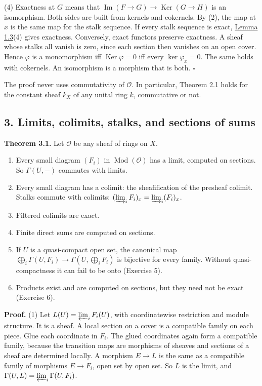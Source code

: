\documentclass[
  english,
  11pt,
  a4paper,
]{article}
\providecommand{\tightlist}{%
  \setlength{\itemsep}{0pt}\setlength{\parskip}{0pt}}
\begin{document}
(4) Exactness at \(G\) means that
\(\operatorname{Im}(F\to G)\to\operatorname{Ker}(G\to H)\) is an
isomorphism. Both sides are built from kernels and cokernels. By (2),
the map at \(x\) is the same map for the stalk sequence. If every stalk
sequence is exact,
\hyperref[sheaves-of-modules-on-a-ringed-space--sheafification-and-the-stalk-test]{Lemma
1.3}(4) gives exactness. Conversely, exact functors preserve exactness.
A sheaf whose stalks all vanish is zero, since each section then
vanishes on an open cover. Hence \(\varphi\) is a monomorphism iff
\(\operatorname{Ker}\varphi=0\) iff every \(\ker\varphi_x=0\). The same
holds with cokernels. An isomorphism is a morphism that is both.
\(\square\)

The proof never uses commutativity of \(\mathcal O\). In particular,
Theorem 2.1 holds for the constant sheaf \(k_X\) of any unital ring
\(k\), commutative or not.

\subsection{3. Limits, colimits, stalks, and sections of
sums}\label{sheaves-of-modules-on-a-ringed-space--3-limits-colimits-stalks-and-sections-of-sums}

\textbf{Theorem 3.1.} Let \(\mathcal O\) be any sheaf of rings on \(X\).

\begin{enumerate}
\tightlist
\item
  Every small diagram \((F_i)\) in \(\operatorname{Mod}(\mathcal O)\)
  has a limit, computed on sections. So \(\Gamma(U,-)\) commutes with
  limits.
\item
  Every small diagram has a colimit: the sheafification of the presheaf
  colimit. Stalks commute with colimits:
  \((\varinjlim_iF_i)_x=\varinjlim_i(F_i)_x\).
\item
  Filtered colimits are exact.
\item
  Finite direct sums are computed on sections.
\item
  If \(U\) is a quasi-compact open set, the canonical map
  \(\bigoplus_i\Gamma(U,F_i)\to\Gamma(U,\bigoplus_iF_i)\) is bijective
  for every family. Without quasi-compactness it can fail to be onto
  (Exercise 5).
\item
  Products exist and are computed on sections, but they need not be
  exact (Exercise 6).
\end{enumerate}

\textbf{Proof.} (1) Let \(L(U)=\varprojlim_iF_i(U)\), with
coordinatewise restriction and module structure. It is a sheaf. A local
section on a cover is a compatible family on each piece. Glue each
coordinate in \(F_i\). The glued coordinates again form a compatible
family, because the transition maps are morphisms of sheaves and
sections of a sheaf are determined locally. A morphism \(E\to L\) is the
same as a compatible family of morphisms \(E\to F_i\), open set by open
set. So \(L\) is the limit, and
\(\Gamma(U,L)=\varprojlim_i\Gamma(U,F_i)\).
\end{document}
